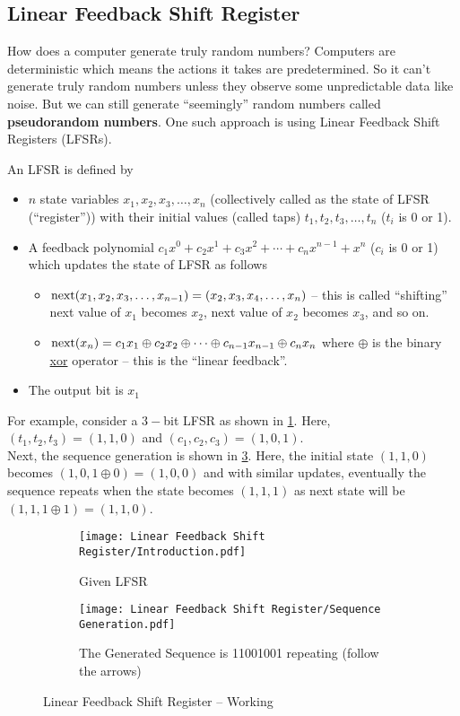 \documentclass[../../Problems]{subfiles}
\begin{document}
\recalctypearea
\subsection{Linear Feedback Shift Register}{\label{pp:linearfeedbackshiftregister}}
How does a computer generate truly random numbers? Computers are deterministic which means the actions it takes are predetermined. So it can't generate truly random numbers unless they observe some unpredictable data like noise. But we can still generate ``seemingly'' random numbers called \textbf{pseudorandom numbers}. One such approach is using Linear Feedback Shift Registers (LFSRs).

An LFSR is defined by
\begin{itemize}	
	\item $n$ state variables $x_1, x_2, x_3,\ldots, x_n$ (collectively called as the state of LFSR (``register'')) with their initial values (called taps) $t_1, t_2, t_3,\ldots, t_n$ ($t_i$ is 0 or 1).
	\item A feedback polynomial $c_1x^0 + c_2x^1 + c_3x^2 + \cdots +  c_nx^{n-1} + x^n$ ($c_i$ is 0 or 1) which updates the state of LFSR as follows
	\begin{itemize}
		\item $\operatorname{next}(x_1, x_2, x_3,\ldots, x_{n-1}) = (x_2, x_3, x_4,\ldots, x_n)$ -- this is called ``shifting'' next value of $x_1$ becomes $x_2$, next value of $x_2$ becomes $x_3$, and so on.
		\item $\operatorname{next}(x_n) =  c_1x_1 \oplus c_2x_2 \oplus \cdots \oplus c_{n-1}x_{n-1}\oplus c_nx_n$ where $\oplus$ is the binary \href{https://en.wikipedia.org/wiki/Exclusive_or}{xor} operator -- this is the ``linear feedback''.
	\end{itemize}
	\item The output bit is $x_1$
\end{itemize}
For example, consider a $3-$bit LFSR as shown in \ref{fig:lfsrintro}. Here, $(t_1,t_2,t_3)=(1,1,0)$ and $(c_1,c_2,c_3)=(1,0,1)$.\\
Next, the sequence generation is shown in \ref{fig:lfsrgeneration}. Here, the initial state $(1,1,0)$ becomes $(1,0,1\oplus0) = (1,0,0)$ and with similar updates, eventually the sequence repeats when the state becomes $(1,1,1)$ as next state will be $(1,1,1\oplus1) = (1,1,0)$.
\begin{figure}[H]
	\centering
	\begin{subfigure}[c]{0.4\linewidth}
		\centering
		\texttt{[image: Linear Feedback Shift Register/Introduction.pdf]}
		\caption{Given LFSR}
		\label{fig:lfsrintro}
	\end{subfigure}
	\begin{subfigure}[c]{0.45\linewidth}
		\centering
		\texttt{[image: Linear Feedback Shift Register/Sequence Generation.pdf]}
		\caption{The Generated Sequence is 11001001 repeating (follow the arrows)}
		\label{fig:lfsrgeneration}
	\end{subfigure}
	\caption{Linear Feedback Shift Register -- Working}
\end{figure}
\end{document}
